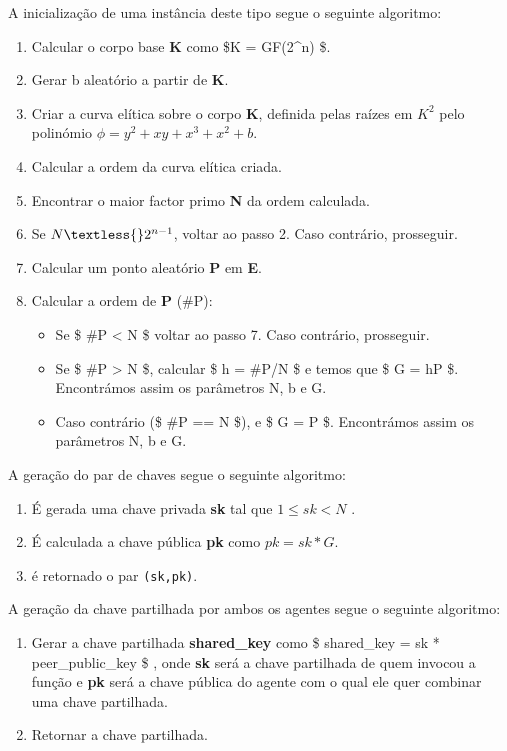 \documentclass[11pt]{article}
\providecommand{\tightlist}{%
      \setlength{\itemsep}{0pt}\setlength{\parskip}{0pt}}
\begin{document}
A inicialização de uma instância deste tipo segue o seguinte algoritmo:

\begin{enumerate}
\def\labelenumi{\arabic{enumi}.}
\tightlist
\item
  Calcular o corpo base \textbf{K} como \$K = GF(2\^{}n) \$.
\item
  Gerar b aleatório a partir de \textbf{K}.
\item
  Criar a curva elítica sobre o corpo \textbf{K}, definida pelas raízes
  em \(K^2\) pelo polinómio $ \phi = y^{2} + xy + x^{3} + x^{2} +
  b$.
\item
  Calcular a ordem da curva elítica criada.
\item
  Encontrar o maior factor primo \textbf{N} da ordem calculada.
\item
  Se $ N \textless{} 2^{n-1} $, voltar ao passo 2. Caso
  contrário, prosseguir.
\item
  Calcular um ponto aleatório \textbf{P} em \textbf{E}.
\item
  Calcular a ordem de \textbf{P} (\#P):

  \begin{itemize}
  \tightlist
  \item
    Se \$ \#P \textless{} N \$ voltar ao passo 7. Caso contrário,
    prosseguir.
  \item
    Se \$ \#P \textgreater{} N \$, calcular \$ h = \#P/N \$ e temos que
    \$ G = hP \$. Encontrámos assim os parâmetros N, b e G.
  \item
    Caso contrário (\$ \#P == N \$), e \$ G = P \$. Encontrámos assim os
    parâmetros N, b e G.
  \end{itemize}
\end{enumerate}

A geração do par de chaves segue o seguinte algoritmo:

\begin{enumerate}
\def\labelenumi{\arabic{enumi}.}
\tightlist
\item
  É gerada uma chave privada \textbf{sk} tal que $ 1 \leqslant sk
  < N $ .
\item
  É calculada a chave pública \textbf{pk} como $ pk = sk * G $.
\item
  é retornado o par \texttt{(sk,pk)}.
\end{enumerate}

A geração da chave partilhada por ambos os agentes segue o seguinte
algoritmo:

\begin{enumerate}
\def\labelenumi{\arabic{enumi}.}
\tightlist
\item
  Gerar a chave partilhada \textbf{shared\_key} como \$ shared\_key = sk
  * peer\_public\_key \$ , onde \textbf{sk} será a chave partilhada de
  quem invocou a função e \textbf{pk} será a chave pública do agente com
  o qual ele quer combinar uma chave partilhada.
\item
  Retornar a chave partilhada.
\end{enumerate}
\end{document}
